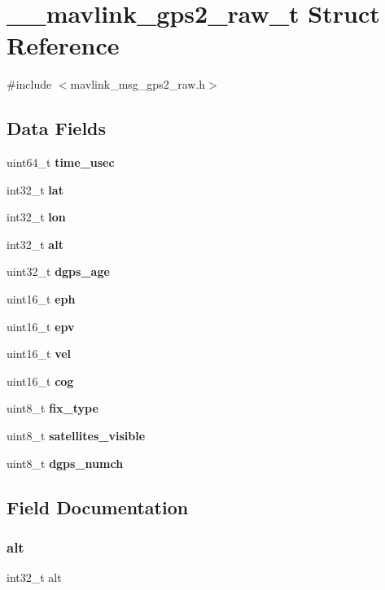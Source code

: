 \section{\+\_\+\+\_\+mavlink\+\_\+gps2\+\_\+raw\+\_\+t Struct Reference}
\label{struct____mavlink__gps2__raw__t}


{\ttfamily \#include $<$mavlink\+\_\+msg\+\_\+gps2\+\_\+raw.\+h$>$}

\subsection*{Data Fields}
\begin{DoxyCompactItemize}
\item 
uint64\+\_\+t \textbf{ time\+\_\+usec}
\item 
int32\+\_\+t \textbf{ lat}
\item 
int32\+\_\+t \textbf{ lon}
\item 
int32\+\_\+t \textbf{ alt}
\item 
uint32\+\_\+t \textbf{ dgps\+\_\+age}
\item 
uint16\+\_\+t \textbf{ eph}
\item 
uint16\+\_\+t \textbf{ epv}
\item 
uint16\+\_\+t \textbf{ vel}
\item 
uint16\+\_\+t \textbf{ cog}
\item 
uint8\+\_\+t \textbf{ fix\+\_\+type}
\item 
uint8\+\_\+t \textbf{ satellites\+\_\+visible}
\item 
uint8\+\_\+t \textbf{ dgps\+\_\+numch}
\end{DoxyCompactItemize}


\subsection{Field Documentation}
\mbox{\label{struct____mavlink__gps2__raw__t_a677cbc2ca7dc4e9f0516bd42110f0062}} 
\subsubsection{alt}
{\footnotesize\ttfamily int32\+\_\+t alt}

